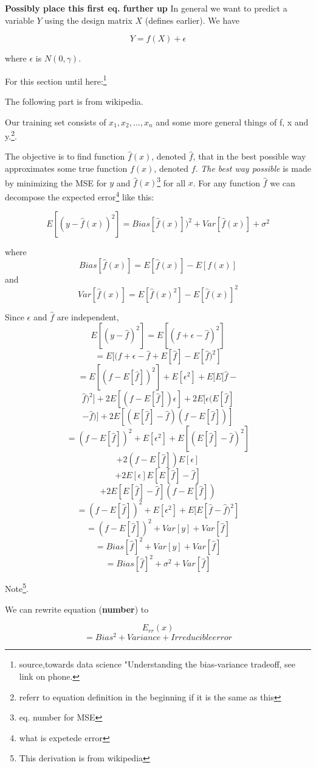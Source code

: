 \documentclass[12pt]{article}
\begin{document}
\begin{multicols}{2}
\textbf{Possibly place this first eq. further up}
In general we want to predict a variable $Y$ using the design matrix $X$ (defines earlier). We have 

$$Y=f(X)+\epsilon$$

where $\epsilon$ is $N(0,\gamma)$.

For this section until here:\footnote{source,towards data science "Understanding the bias-variance tradeoff, see link on phone.}


The following part is from wikipedia.

Our training set consists of $x_1,x_2,...,x_n$ and some more general things of f, x and y.\footnote{referr to equation definition in the beginning if it is the same as this}.


The objective is to find  function $\hat{f}(x)$, denoted $\hat{f}$, that in the best possible way approximates some true function $f(x)$, denoted $f$. \textit{The best way possible} is made by minimizing the MSE for $y$ and $\hat{f}(x)$\footnote{eq. number for MSE} for all $x$. 
For any function $\hat{f}$ we can decompose the expected error\footnote{what is expetede error} like this:

$$E[(y-\hat{f}(x))^2]=Bias[\hat{f}(x)])^2+Var[\hat{f}(x)]+\sigma^2$$

where $$Bias[\hat{f}(x)]=E[\hat{f}(x)]-E[f(x)]$$
and $$Var[\hat{f}(x)]=E[\hat{f}(x)^2] - E[\hat{f}(x)]^2$$

Since $\epsilon$ and $\hat{f}$ are independent,
$$E[(y-\hat{f})^2]=E[(f+\epsilon-\hat{f})^2]$$
$$=E[(f+\epsilon-\hat{f}+E[\hat{f}]-E[\hat{f})^2]$$
$$=E[(f-E[\hat{f}])^2]+E[\epsilon^2]+E[E[\hat{f}-$$$$\hat{f})^2]+2E[(f-E[\hat{f}])\epsilon]+2E[\epsilon(E[\hat{f}]$$ $$-\hat{f})]+2E[(E[\hat{f}]-\hat{f})(f-E[\hat{f}])]$$
$$=(f-E[\hat{f}])^2+E[\epsilon^2]+E[(E[\hat{f}]-\hat{f})^2]$$   $$+2(f-E[\hat{f}])E[\epsilon]$$
$$+2E[\epsilon]E[E[\hat{f}]-\hat{f}]$$
$$+2E[E[\hat{f}]-\hat{f}](f-E[\hat{f}])$$
$$=(f-E[\hat{f}])^2+E[\epsilon^2]+E[E[\hat{f}-\hat{f})^2]$$
$$=(f-E[\hat{f}])^2+Var[y]+Var[\hat{f}]$$
$$=Bias[\hat{f}]^2+Var[y]+Var[\hat{f}]$$
$$=Bias[\hat{f}]^2+\sigma^2+Var[\hat{f}]$$



Note\footnote{This derivation is from wikipedia}.

We can rewrite equation (\textbf{number}) to 

$$E_{rr}(x)$$
$$=Bias^2+Variance+Irreducibleerror$$



\end{multicols}
\end{document}

